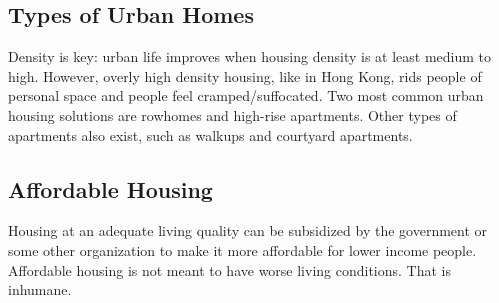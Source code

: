 \documentclass{article}
\begin{document}
    \subsection{Types of Urban Homes}
    \begin{outline}
        \1 Density is key: urban life improves when housing density is at least medium to high. However, overly high density housing, like in Hong Kong, rids people of personal space and people feel cramped/suffocated. 
        \1 Two most common urban housing solutions are rowhomes and high-rise apartments. Other types of apartments also exist, such as walkups and courtyard apartments. 
    \end{outline}
    \subsection{Affordable Housing}
    \begin{outline}
        \1 Housing at an adequate living quality can be subsidized by the government or some other organization to make it more affordable for lower income people. 
        \1 Affordable housing is not meant to have worse living conditions. That is inhumane. 
    \end{outline}
\end{document}
